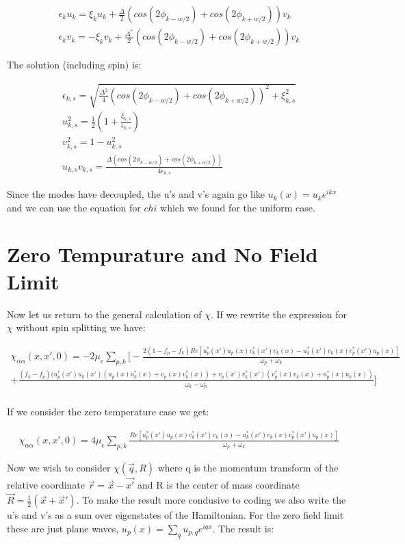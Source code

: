 \documentclass{article}
\begin{document}
\begin{align*}
\epsilon_k u_k=\xi_k u_k+\frac{\Delta}{2} (cos(2\phi_{k-w/2})+cos(2\phi_{k+w/2}))v_k \\
\epsilon_k v_k=-\xi_k v_k+\frac{\Delta^*}{2} (cos(2\phi_{k-w/2})+cos(2\phi_{k+w/2}))v_k
\end{align*}

The solution (including spin) is:

\begin{align*}
\epsilon_{k,s}=\sqrt{\frac{\Delta^2}{4} (cos(2\phi_{k-w/2})+cos(2\phi_{k+w/2}))^2+\xi_{k,s}^2} \\
u_{k,s}^2=\frac{1}{2}(1+\frac{\xi_{k,s}}{\epsilon_{k,s}}) \\
v_{k,s}^2=1-u_{k,s}^2 \\
u_{k,s}v_{k,s}=\frac{\Delta (cos(2\phi_{k-w/2})+cos(2\phi_{k+w/2}))}{4\epsilon_{k,s}}
\end{align*}

Since the modes have decoupled, the u's and v's again go like $u_k(x)=u_k e^{ikx}$ and we can use the equation for $chi$ which we found for the uniform case.

\section*{Zero Tempurature and No Field Limit}
Now let us return to the general calculation of $\chi$. If we rewrite the expression for $\chi$ without spin splitting we have:

\begin{align*}
\chi_{\alpha\alpha}(x,x',0)=-2\mu_e\sum\limits_{p,k}\bigg[-\frac{2(1-f_{p}-f_{k})Re[u^*_p(x')u_p(x)v^*_k(x')v_k(x)-u^*_k(x')v_k(x)v^*_p(x')u_p(x)]}{\omega_{p}+\omega_{k}} \\
+\frac{(f_{k}-f_{p})(u^*_p(x')u_k(x')(u_p(x)u^*_k(x)+v_p(x)v^*_k(x))+v_p(x')v^*_k(x')(v^*_p(x)v_k(x)+u^*_p(x)u_k(x))}{\omega_{k}-\omega_{p}}\bigg] \\
\end{align*}

If we consider the zero temperature case we get:

\begin{align*}
\chi_{\alpha\alpha}(x,x',0)=4\mu_e\sum\limits_{p,k}\frac{Re[u^*_p(x')u_p(x)v^*_k(x')v_k(x)-u^*_k(x')v_k(x)v^*_p(x')u_p(x)]}{\omega_{p}+\omega_{k}}
\end{align*}

Now we wish to consider $\chi(\vec{q},R)$ where q is the momentum transform of the relative coordinate $\vec{r}=\vec{x}-\vec{x'}$ and R is the center of mass coordinate $\vec{R}=\frac{1}{2}(\vec{x}+\vec{x}')$. To make the result more condusive to coding we also write the u's and v's as a sum over eigenstates of the Hamiltonian. For the zero field limit these are just plane waves, $u_p(x)=\sum\limits_q u_{p,q} e^{iqx}$. The result is:
\end{document}
